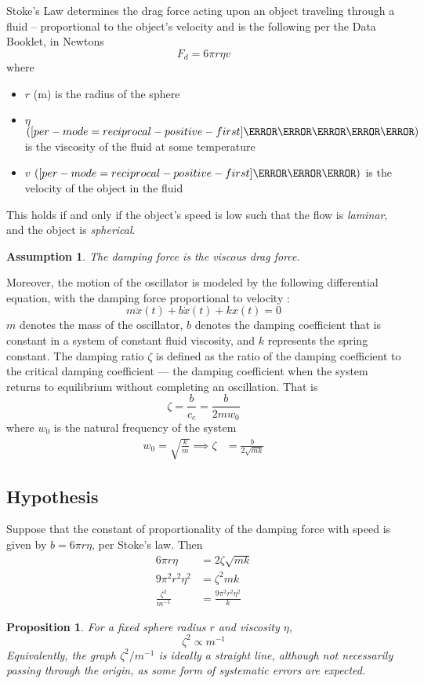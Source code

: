 \documentclass[a4paper,12pt]{article}
\newtheorem{proposition}{Proposition}
\newtheorem{assumption}{Assumption}
\let\oldsi\si
\renewcommand{\si}[1]{\oldsi[per-mode=reciprocal-positive-first]{#1}}
\begin{document}
Stoke's Law determines the drag force acting upon an object traveling through a fluid -- proportional to the object's velocity and is the following per the Data Booklet, in Newtons
$$F_d = 6\pi r \eta v $$ where
\begin{itemize}
  \item $r$ (m) is the radius of the sphere
  \item $\eta$ $(\si{\N\s\per\m\squared})$ is the viscosity of the fluid at some temperature
  \item $v$ $(\si{\m\per\s})$ is the velocity of the object in the fluid
\end{itemize}
This holds if and only if the object's speed is low such that the flow is \textit{laminar}, and the object is \textit{spherical}.

\begin{assumption}
  \label{as:1}
  The damping force is the viscous drag force.
\end{assumption}

Moreover, the motion of the oscillator is modeled by the following differential equation, with the damping force proportional to velocity \parencite{miller_2004_13}:
\begin{equation}
  \label{eq:1}
  m\ddot{x}(t) + b\dot{x}(t) + kx(t) = 0
\end{equation}
$m$ denotes the mass of the oscillator, $b$ denotes the damping coefficient that is constant in a system of constant fluid viscosity, and $k$ represents the spring constant. The damping ratio $\zeta$ is defined as the ratio of the damping coefficient to the critical damping coefficient --- the damping coefficient when the system returns to equilibrium without completing an oscillation. That is $$\zeta = \frac{b}{c_c} = \frac{b}{2mw_0}$$
where $w_0$ is the natural frequency of the system
\begin{align*}
  w_0            = \sqrt{\frac{k}{m}}\implies \zeta & = \frac{b}{2\sqrt{mk}}
\end{align*}

\subsection{Hypothesis}

Suppose that the constant of proportionality of the damping force with speed is given by $b = 6\pi r \eta$, per Stoke's law. Then
\begin{align*}
  6\pi r \eta            & = 2\zeta \sqrt{mk}            \\
  9\pi^2 r^2 \eta^2      & = \zeta^2mk                   \\
  \frac{\zeta^2}{m^{-1}} & = \frac{9\pi^2 r^2 \eta^2}{k}
\end{align*}
\begin{proposition}
  For a fixed sphere radius $r$ and viscosity $\eta$, \begin{equation}
    \zeta^2 \propto m^{-1}
  \end{equation}
  Equivalently, the graph $\zeta^2/m^{-1}$ is ideally a straight line, although not necessarily passing through the origin, as some form of systematic errors are expected.
  \label{prop:1}
\end{proposition}
\end{document}
